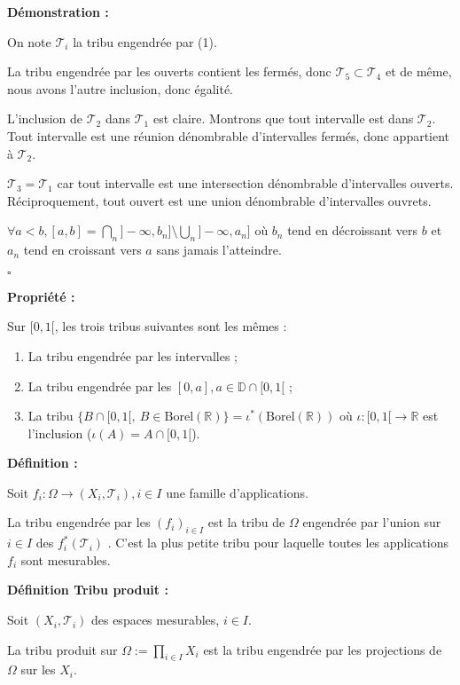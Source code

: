 \documentclass[10pt,a4paper,notitlepage ]{report}
\newcommand{\R}{\mathbb R}
\newcommand{\T}{\mathcal T}
\newcommand{\1}{\mathds 1}
\newcommand{\borel}{\mathrm{Borel}}
\newenvironment{definition}[1][]{
	
	\textbf{Définition #1 : }
}
{}
\newcounter{th}
\newenvironment{propriete}[1][]{
	\begin{tcolorbox}
		\textbf{Propriété #1 : }
}
{\end{tcolorbox}}
\newenvironment{demo}[1][]{

	\textbf{Démonstration #1 :}
}{\begin{flushright}
	$\square$
\end{flushright}
}
\begin{document}
\begin{demo}

On note $\T_i $ la tribu engendrée par (1).

La tribu engendrée par les ouverts contient les fermés, donc $\T_5 \subset \T_4 $ et de même, nous avons l'autre inclusion, donc égalité. 

L'inclusion de $\T_2 $ dans $\T_1$ est claire. Montrons que tout intervalle est dans $\T_2$. Tout intervalle est une réunion dénombrable d'intervalles fermés, donc appartient à $\T_2$.

$\T_3 = \T_1$ car tout intervalle est une intersection dénombrable d'intervalles ouverts. Réciproquement, tout ouvert est une union dénombrable d'intervalles ouvrets.

$\forall a < b, [a,b] = \bigcap_n ]-\infty, b_n ] \setminus \bigcup_n ]-\infty, a_n ]$ où $b_n$ tend en décroissant vers $b$ et $a_n$ tend en croissant vers $a$ sans jamais l'atteindre. 
\end{demo}

\begin{propriete}
Sur $[0, 1[$, les trois tribus suivantes sont les mêmes : 
\begin{enumerate}
\item La tribu engendrée par les intervalles ;
\item La tribu engendrée par les $[0, a], a \in \mathbb{D} \cap [0,1[ $ ;
\item La tribu $\lbrace B \cap [0,1[,\ B \in \borel(\R) \rbrace = \iota^*(\borel(\R)) $ où $\iota:[0,1[\rightarrow \R$ est l'inclusion ($\iota(A) = A\cap [0,1[$).
\end{enumerate}

\end{propriete}

\begin{definition}
Soit $f_i : \Omega \rightarrow (X_i , \T_i ) , i \in I$ une famille d'applications.

La tribu engendrée par les $(f_i)_{ i \in I }$ est la tribu de $\Omega$ engendrée par l'union sur $i \in I$ des $f_i^*(\T_i ) $ . C'est la plus petite tribu pour laquelle toutes les applications $f_i$ sont mesurables.
\end{definition}

\begin{definition}[Tribu produit]

Soit $(X_i , \T_i )$ des espaces mesurables, $i \in I $.

La tribu produit sur $\Omega := \prod_{i\in I} X_i $ est la tribu engendrée par les projections de $\Omega$ sur les $X_i$.

\end{definition}
\end{document}
